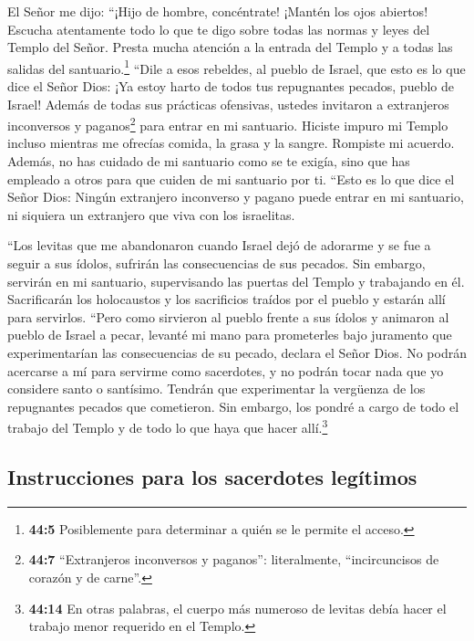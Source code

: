  El Señor me dijo: ``¡Hijo de hombre, concéntrate! ¡Mantén
los ojos abiertos! Escucha atentamente todo lo que te digo sobre todas
las normas y leyes del Templo del Señor. Presta mucha atención a la
entrada del Templo y a todas las salidas del santuario.\footnote{\textbf{44:5}
  Posiblemente para determinar a quién se le permite el acceso.}
 ``Dile a esos rebeldes, al pueblo de Israel, que esto es
lo que dice el Señor Dios: ¡Ya estoy harto de todos tus repugnantes
pecados, pueblo de Israel!  Además de todas sus prácticas
ofensivas, ustedes invitaron a extranjeros inconversos y
paganos\footnote{\textbf{44:7} ``Extranjeros inconversos y paganos'':
  literalmente, ``incircuncisos de corazón y de carne''.} para entrar en
mi santuario. Hiciste impuro mi Templo incluso mientras me ofrecías
comida, la grasa y la sangre. Rompiste mi acuerdo. 
Además, no has cuidado de mi santuario como se te exigía, sino que has
empleado a otros para que cuiden de mi santuario por ti. 
``Esto es lo que dice el Señor Dios: Ningún extranjero inconverso y
pagano puede entrar en mi santuario, ni siquiera un extranjero que viva
con los israelitas.

 ``Los levitas que me abandonaron cuando Israel dejó de
adorarme y se fue a seguir a sus ídolos, sufrirán las consecuencias de
sus pecados.  Sin embargo, servirán en mi santuario,
supervisando las puertas del Templo y trabajando en él. Sacrificarán los
holocaustos y los sacrificios traídos por el pueblo y estarán allí para
servirlos.  ``Pero como sirvieron al pueblo frente a sus
ídolos y animaron al pueblo de Israel a pecar, levanté mi mano para
prometerles bajo juramento que experimentarían las consecuencias de su
pecado, declara el Señor Dios.  No podrán acercarse a mí
para servirme como sacerdotes, y no podrán tocar nada que yo considere
santo o santísimo. Tendrán que experimentar la vergüenza de los
repugnantes pecados que cometieron.  Sin embargo, los
pondré a cargo de todo el trabajo del Templo y de todo lo que haya que
hacer allí.\footnote{\textbf{44:14} En otras palabras, el cuerpo más
  numeroso de levitas debía hacer el trabajo menor requerido en el
  Templo.}

\hypertarget{instrucciones-para-los-sacerdotes-leguxedtimos}{%
\subsection{Instrucciones para los sacerdotes
legítimos}\label{instrucciones-para-los-sacerdotes-leguxedtimos}}

